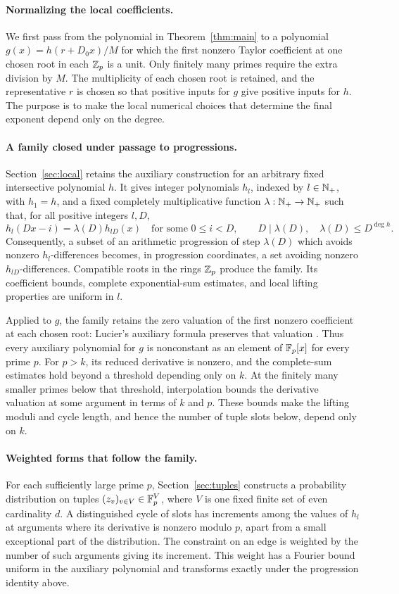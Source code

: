 \paragraph{Normalizing the local coefficients.}
We first pass from the polynomial in Theorem~\ref{thm:main} to a polynomial
$g(x)=h(r+D_0x)/M$ for which the first nonzero Taylor coefficient at one
chosen root in each $\mathbb Z_p$ is a unit. Only finitely many primes require the
extra division by $M$. The multiplicity of each chosen root is retained, and
the representative $r$ is chosen so that positive inputs for $g$ give positive
inputs for $h$. The purpose is to make the local numerical choices that
determine the final exponent depend only on the degree.

\paragraph{A family closed under passage to progressions.}
Section~\ref{sec:local} retains the auxiliary construction for an arbitrary
fixed intersective polynomial $h$. It gives integer polynomials $h_l$, indexed by
$l\in\mathbb N_+$, with $h_1=h$, and a fixed completely multiplicative function
$\lambda:\mathbb N_+\to\mathbb N_+$ such that, for all positive integers $l,D$,
\[
 h_l(Dx-i)=\lambda(D)h_{lD}(x)
 \quad\text{for some }0\le i<D,
 \qquad D\mid\lambda(D),\quad \lambda(D)\le D^{\deg h}.
\]
Consequently, a subset of an arithmetic progression of step $\lambda(D)$
which avoids nonzero $h_l$-differences becomes, in progression coordinates,
a set avoiding nonzero $h_{lD}$-differences. Compatible roots in the rings
$\mathbb Z_p$ produce the family. Its coefficient bounds, complete exponential-sum
estimates, and local lifting properties are uniform in $l$.

Applied to $g$, the family retains the zero valuation of the first nonzero
coefficient at each chosen root: Lucier's auxiliary formula preserves that
valuation \cite[Section~8]{Lucier2006}. Thus every auxiliary polynomial for
$g$ is nonconstant as an element of $\mathbb F_p[x]$ for every prime $p$. For
$p>k$, its reduced derivative is nonzero, and the complete-sum estimates hold
beyond a threshold depending only on $k$. At the finitely many smaller primes below that
threshold, interpolation bounds the derivative valuation at some argument in
terms of $k$ and $p$. These bounds make the lifting moduli and cycle length,
and hence the number of tuple slots below, depend only on $k$.

\paragraph{Weighted forms that follow the family.}
For each sufficiently large prime $p$, Section~\ref{sec:tuples} constructs a
probability distribution on tuples $(z_v)_{v\in V}\in\mathbb F_p^V$, where $V$ is
one fixed finite set of even cardinality $d$. A distinguished cycle of slots
has increments among the values of $h_l$ at arguments where its derivative is
nonzero modulo $p$, apart from a small exceptional part of the distribution.
The constraint on an edge is weighted by the number of such arguments giving
its increment. This weight has a Fourier bound uniform in the auxiliary
polynomial and transforms exactly under the progression identity above.

